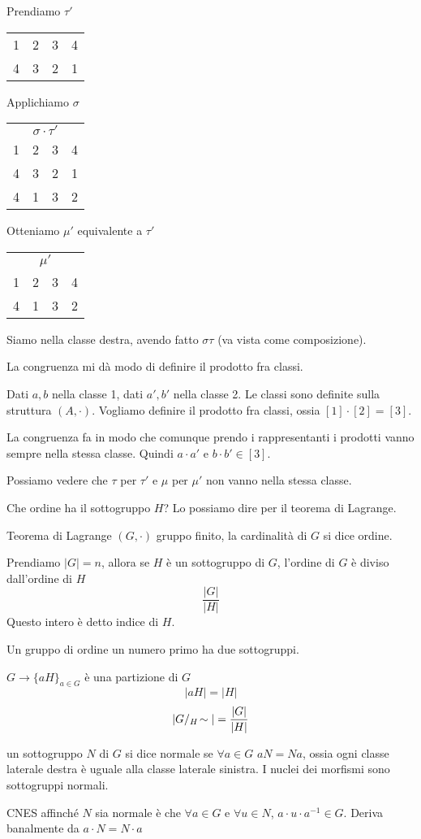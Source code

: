Prendiamo $\tau'$

\begin{tabular}{cccc}
1 & 2 & 3 & 4 \\
4 & 3 & 2 & 1
\end{tabular}

Applichiamo $\sigma$

\begin{tabular}{cccc}
\multicolumn{4}{c}{$\sigma \cdot \tau'$} \\
1 & 2 & 3 & 4 \\
4 & 3 & 2 & 1 \\
4 & 1 & 3 & 2
\end{tabular}

Otteniamo $\mu'$ equivalente a $\tau'$

\begin{tabular}{cccc}
\multicolumn{4}{c}{$\mu'$} \\
1 & 2 & 3 & 4 \\
4 & 1 & 3 & 2
\end{tabular}


Siamo nella classe destra, avendo fatto $\sigma \tau$ (va vista come composizione).

La congruenza mi d\`a modo di definire il prodotto fra classi. 

Dati $a, b$ nella classe 1, dati $a', b'$ nella classe 2. Le classi sono definite sulla struttura $(A, \cdot)$. Vogliamo definire il prodotto fra classi, ossia $[1] \cdot [2] = [3]$. 

La congruenza fa in modo che comunque prendo i rappresentanti i prodotti vanno sempre nella stessa classe. Quindi $a \cdot a'$ e $b \cdot b' \in [3]$.

Possiamo vedere che $\tau$ per $\tau'$ e $\mu$ per $\mu'$ non vanno nella stessa classe.

Che ordine ha il sottogruppo $H$? Lo possiamo dire per il teorema di Lagrange.

Teorema di Lagrange
$(G, \cdot)$ gruppo finito, la cardinalit\`a di $G$ si dice ordine.

Prendiamo $|G| = n$, allora se $H$ \`e un sottogruppo di $G$, l'ordine di $G$ \`e diviso dall'ordine di $H$
\[
\frac{|G|}{|H|}
\]
Questo intero \`e detto indice di $H$.

Un gruppo di ordine un numero primo ha due sottogruppi.

$G \to \{ a H\}_{a \in G}$
\`e una partizione di $G$
\[
|a H| = |H|
\]
\[
|G / {}_{H}\!\sim| = \frac{|G|}{|H|}
\]
\begin{defn}
un sottogruppo $N$ di $G$ si dice normale se $\forall a \in G$ $a N = N a$, ossia ogni classe laterale destra \`e uguale alla classe laterale sinistra. I nuclei dei morfismi sono sottogruppi normali.
\end{defn}
CNES affinch\'e $N$ sia normale \`e che $\forall a \in G$ e $\forall u \in N$, $a \cdot u \cdot a^{-1} \in G$. Deriva banalmente da $a \cdot N = N \cdot a$


